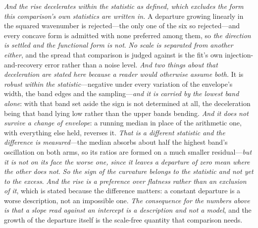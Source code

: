 \documentclass[11pt,a4paper]{article}
\theoremstyle{plain}
\theoremstyle{definition}
\theoremstyle{remark}
\begin{document}
\emph{And the rise decelerates within the statistic as defined, which excludes the form this comparison's
own statistics are written in.} A departure growing linearly in the squared wavenumber is rejected---the
only one of the six so rejected---and every concave form is admitted with none preferred among them, so
\emph{the direction is settled and the functional form is not}. \emph{No scale is separated from another
either}, and the spread that comparison is judged against is the fit's own injection-and-recovery error rather
than a noise level. \emph{And two
things about that deceleration are stated here because a reader would otherwise assume both.} It is
\emph{robust within the statistic}---negative under every variation of the envelope's width, the band edges
and the sampling---\emph{and it is carried by the lowest band alone}: with that band set aside the sign is
not determined at all, the deceleration being that band lying low rather than the upper bands bending.
\emph{And it does not survive a change of envelope}: a running median in place of the arithmetic one, with
everything else held, reverses it. \emph{That is a different statistic and the difference is measured}---the
median absorbs about half the highest band's oscillation on both arms, so its ratios are formed on a much
smaller residual---\emph{but it is not on its face the worse one, since it leaves a departure of zero mean
where the other does not}. \emph{So the sign of the curvature belongs to the statistic and not yet to the
excess}. \emph{And the rise is a preference
over flatness rather than an exclusion of it}, which is stated because the difference matters: a constant
departure is a worse description, not an impossible one. \emph{The consequence for the numbers above is
that a slope read against an intercept is a description and not a model}, and the growth of the departure
itself is the scale-free quantity that comparison needs.
\end{document}
